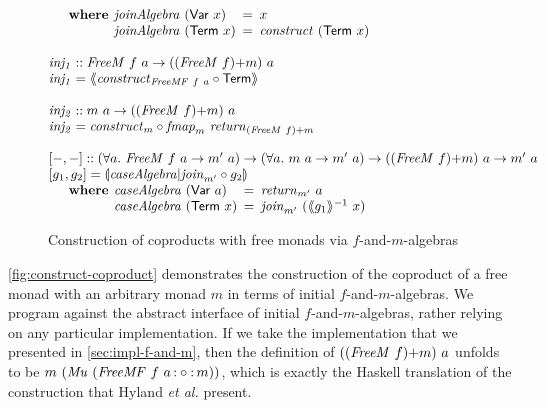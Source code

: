 \documentclass{jfp1}
\newcommand{\eFold}[2]{\llparenthesis #1|#2 \rrparenthesis}
\newcommand{\fmext}[1]{\langle\kern-0.25em\langle #1 \rangle\kern-0.25em\rangle}
\newcommand{\kw}[1]{\textbf{#1}}
\begin{document}
\begin{figure}
\begin{displaymath}
\begin{array}{@{}l}
\begin{array}{@{}l}
        \quad\begin{array}{r@{\hspace{0.4em}}l@{\hspace{0.5em}}c@{\hspace{0.5em}}l}
          \kw{where} & \mathit{joinAlgebra}~(\mathsf{Var}~x) &=& x \\
          & \mathit{joinAlgebra}~(\mathsf{Term}~x) &=& \mathit{construct}~(\mathsf{Term}~x)
        \end{array}
      \end{array} \\
      \\
      \mathit{inj_1} :: \mathit{FreeM}~f~a \to (\cprd{(\mathit{FreeM}~f)}{m})~a \\
      \mathit{inj_1} = \fmext{\mathit{construct}_{\mathit{FreeMF}~f~a} \circ \mathsf{Term}} \\
      \\
      \mathit{inj_2} :: m~a \to (\cprd{(\mathit{FreeM}~f)}{m})~a \\
      \mathit{inj_2} = \mathit{construct}_m \circ \mathit{fmap}_m~\mathit{return}_{\cprd{(\mathit{FreeM}~f)}{m}}\\
      \\
      \begin{array}{@{}l}
        {}[-,-] :: (\forall a.~\mathit{FreeM}~f~a \to m'~a) \to (\forall a.~m~a \to m'~a) \to (\cprd{(\mathit{FreeM}~f)}{m})~a \to m'~a \\
        {}[g_1,g_2] = \eFold{\mathit{caseAlgebra}}{\mathit{join}_{m'} \circ g_2} \\
        \quad\begin{array}{r@{\hspace{0.4em}}l@{\hspace{0.5em}}c@{\hspace{0.5em}}l}
          \kw{where} & \mathit{caseAlgebra}~(\mathsf{Var}~a) &=& \mathit{return}_{m'}~a \\
          & \mathit{caseAlgebra}~(\mathsf{Term}~x) &=& \mathit{join}_{m'}~(\fmext{g_1}^{-1}~x)
        \end{array}
      \end{array}
    \end{array}
  \end{displaymath}
  \caption{Construction of coproducts with free monads via $f$-and-$m$-algebras}
  \label{fig:construct-coproduct}
\end{figure}

\autoref{fig:construct-coproduct} demonstrates the construction of the
coproduct of a free monad with an arbitrary monad $m$ in terms of
initial $f$-and-$m$-algebras. We program against the abstract
interface of initial $f$-and-$m$-algebras, rather relying on any
particular implementation. If we take the implementation that we
presented in \autoref{sec:impl-f-and-m}, then the definition of
$((\mathit{FreeM}~f)\mathord{+}m)~a$ unfolds to be
$m~(\mathit{Mu}~(\mathit{FreeMF}~f~a \mathop{\mathord:\circ\mathord:} m))$, which is exactly
the Haskell translation of the construction that Hyland \emph{et al.}
present.
\end{document}
